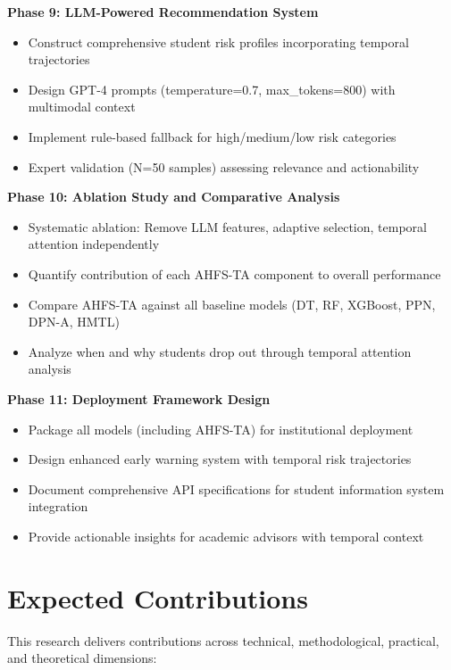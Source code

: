 \textbf{Phase 9: LLM-Powered Recommendation System}
\begin{itemize}
\item Construct comprehensive student risk profiles incorporating temporal trajectories
\item Design GPT-4 prompts (temperature=0.7, max\_tokens=800) with multimodal context
\item Implement rule-based fallback for high/medium/low risk categories
\item Expert validation (N=50 samples) assessing relevance and actionability
\end{itemize}

\textbf{Phase 10: Ablation Study and Comparative Analysis}
\begin{itemize}
\item Systematic ablation: Remove LLM features, adaptive selection, temporal attention independently
\item Quantify contribution of each AHFS-TA component to overall performance
\item Compare AHFS-TA against all baseline models (DT, RF, XGBoost, PPN, DPN-A, HMTL)
\item Analyze when and why students drop out through temporal attention analysis
\end{itemize}

\textbf{Phase 11: Deployment Framework Design}
\begin{itemize}
\item Package all models (including AHFS-TA) for institutional deployment
\item Design enhanced early warning system with temporal risk trajectories
\item Document comprehensive API specifications for student information system integration
\item Provide actionable insights for academic advisors with temporal context
\end{itemize}

\section{Expected Contributions}

This research delivers contributions across technical, methodological, practical, and theoretical dimensions:

